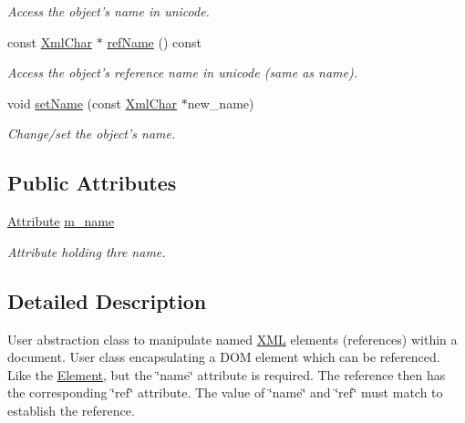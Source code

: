 \begin{DoxyCompactItemize}
\begin{DoxyCompactList}\small\item\em Access the object's name in unicode. \item\end{DoxyCompactList}\item 
const \hyperlink{namespace_d_d4hep_1_1_x_m_l_a09e5d9cc86ed782f6826dfe0778c1815}{XmlChar} $\ast$ \hyperlink{class_d_d4hep_1_1_x_m_l_1_1_ref_element_ab7f8c264c97670244ff179b7c89e8dfa}{refName} () const 
\begin{DoxyCompactList}\small\item\em Access the object's reference name in unicode (same as name). \item\end{DoxyCompactList}\item 
void \hyperlink{class_d_d4hep_1_1_x_m_l_1_1_ref_element_ab466a91b8e0dd13e48ae8a74662b92d5}{setName} (const \hyperlink{namespace_d_d4hep_1_1_x_m_l_a09e5d9cc86ed782f6826dfe0778c1815}{XmlChar} $\ast$new\_\-name)
\begin{DoxyCompactList}\small\item\em Change/set the object's name. \item\end{DoxyCompactList}\end{DoxyCompactItemize}
\subsection*{Public Attributes}
\begin{DoxyCompactItemize}
\item 
\hyperlink{namespace_d_d4hep_1_1_x_m_l_a5c19b7116be99d69b4b22d911357baaf}{Attribute} \hyperlink{class_d_d4hep_1_1_x_m_l_1_1_ref_element_a581df5a2c94d0c6ed1bacce5e478928d}{m\_\-name}
\begin{DoxyCompactList}\small\item\em Attribute holding thre name. \item\end{DoxyCompactList}\end{DoxyCompactItemize}


\subsection{Detailed Description}
User abstraction class to manipulate named \hyperlink{namespace_d_d4hep_1_1_x_m_l}{XML} elements (references) within a document. User class encapsulating a DOM element which can be referenced. Like the \hyperlink{class_d_d4hep_1_1_x_m_l_1_1_element}{Element}, but the \char`\"{}name\char`\"{} attribute is required. The reference then has the corresponding \char`\"{}ref\char`\"{} attribute. The value of \char`\"{}name\char`\"{} and \char`\"{}ref\char`\"{} must match to establish the reference.

